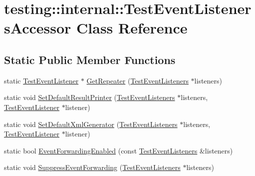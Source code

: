 \hypertarget{classtesting_1_1internal_1_1_test_event_listeners_accessor}{\section{testing\-:\-:internal\-:\-:Test\-Event\-Listeners\-Accessor Class Reference}
\label{classtesting_1_1internal_1_1_test_event_listeners_accessor}
}
\subsection*{Static Public Member Functions}
\begin{DoxyCompactItemize}
\item 
static \hyperlink{classtesting_1_1_test_event_listener}{Test\-Event\-Listener} $\ast$ \hyperlink{classtesting_1_1internal_1_1_test_event_listeners_accessor_a07c6f8644e509d0f23c0c16a60856387}{Get\-Repeater} (\hyperlink{classtesting_1_1_test_event_listeners}{Test\-Event\-Listeners} $\ast$listeners)
\item 
static void \hyperlink{classtesting_1_1internal_1_1_test_event_listeners_accessor_ac8886c7cea5a4ad39aed276d3f58da75}{Set\-Default\-Result\-Printer} (\hyperlink{classtesting_1_1_test_event_listeners}{Test\-Event\-Listeners} $\ast$listeners, \hyperlink{classtesting_1_1_test_event_listener}{Test\-Event\-Listener} $\ast$listener)
\item 
static void \hyperlink{classtesting_1_1internal_1_1_test_event_listeners_accessor_a8c04463b5ba5ee6d6da36e2171c7fff0}{Set\-Default\-Xml\-Generator} (\hyperlink{classtesting_1_1_test_event_listeners}{Test\-Event\-Listeners} $\ast$listeners, \hyperlink{classtesting_1_1_test_event_listener}{Test\-Event\-Listener} $\ast$listener)
\item 
static bool \hyperlink{classtesting_1_1internal_1_1_test_event_listeners_accessor_a4a7522557045cb55eb037dc61429d71c}{Event\-Forwarding\-Enabled} (const \hyperlink{classtesting_1_1_test_event_listeners}{Test\-Event\-Listeners} \&listeners)
\item 
static void \hyperlink{classtesting_1_1internal_1_1_test_event_listeners_accessor_abfc0a0f8163465f4f5d42436ec8c7cb3}{Suppress\-Event\-Forwarding} (\hyperlink{classtesting_1_1_test_event_listeners}{Test\-Event\-Listeners} $\ast$listeners)
\end{DoxyCompactItemize}


